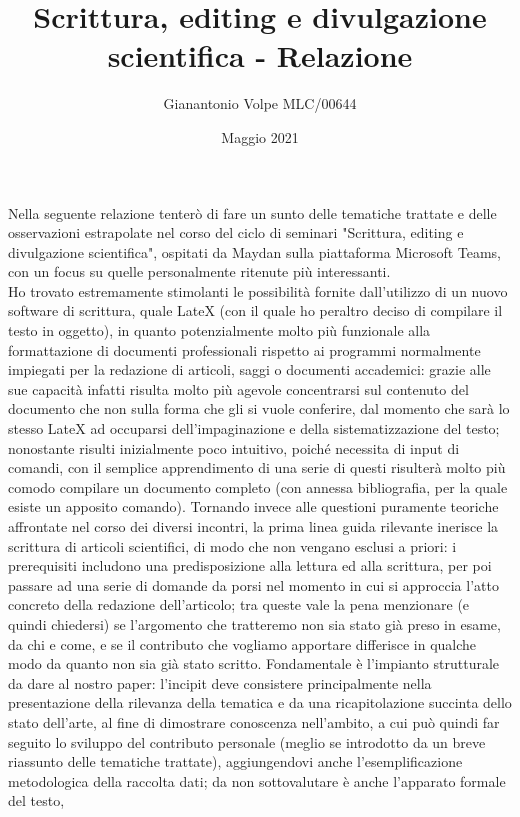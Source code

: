 \documentclass{article}
\title{Scrittura, editing e divulgazione scientifica - Relazione}
\author{Gianantonio Volpe MLC/00644 }
\date{Maggio 2021}
\begin{document}
\maketitle
Nella seguente relazione tenterò di fare un sunto delle tematiche trattate e delle osservazioni estrapolate nel corso del ciclo di seminari
"Scrittura, editing e divulgazione scientifica", ospitati da Maydan sulla piattaforma Microsoft Teams, con un focus su quelle personalmente ritenute più interessanti. 
\\ Ho trovato estremamente stimolanti le possibilità fornite dall'utilizzo di un nuovo software di scrittura, quale LateX 
(con il quale ho peraltro deciso di compilare il testo in oggetto),
in quanto potenzialmente molto più funzionale alla formattazione di documenti professionali rispetto ai programmi normalmente impiegati per la redazione di articoli, 
saggi o documenti accademici: grazie alle sue capacità infatti risulta molto più agevole concentrarsi sul contenuto del documento che non sulla forma che gli si vuole
conferire, dal momento che sarà lo stesso LateX ad occuparsi dell'impaginazione e della sistematizzazione del testo; nonostante risulti inizialmente poco intuitivo, 
poiché necessita di input di comandi, con il semplice apprendimento di una serie di questi risulterà molto più comodo compilare un documento completo 
(con annessa bibliografia, per la quale esiste un apposito comando). Tornando invece alle questioni puramente teoriche affrontate nel corso dei diversi incontri,
la prima linea guida rilevante inerisce la scrittura di articoli scientifici, di modo che non vengano esclusi a priori: i prerequisiti includono una 
predisposizione alla lettura ed alla scrittura, per poi passare ad una serie di domande da porsi nel momento in cui si approccia l'atto concreto della redazione 
dell'articolo; tra queste vale la pena menzionare (e quindi chiedersi) se l'argomento che tratteremo non sia stato già preso in esame, da chi e come,
e se il contributo che vogliamo apportare differisce in qualche modo da quanto non sia già stato scritto. 
Fondamentale è l'impianto strutturale da dare al nostro paper: l'incipit deve consistere principalmente nella presentazione della rilevanza della
tematica e da una ricapitolazione succinta dello stato dell'arte, al fine di dimostrare conoscenza nell'ambito,
a cui può quindi far seguito lo sviluppo del contributo personale (meglio se introdotto da un breve riassunto delle tematiche trattate), 
aggiungendovi anche l'esemplificazione metodologica della raccolta dati; da non sottovalutare è anche l'apparato formale del testo,
\end{document}
